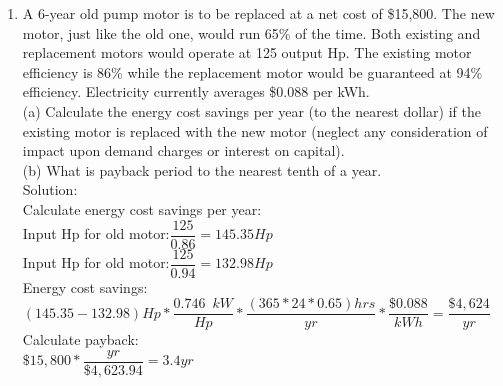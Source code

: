 \begin{enumerate}[1.]
\item A 6-year old pump motor is to be replaced at a net cost of \$15,800. The new motor, just like the old one, would run 65\% of the time. Both existing and replacement motors would operate at 125 output Hp. The existing motor efficiency is 86\% while the replacement motor would be guaranteed at 94\% efficiency. Electricity currently averages \$0.088 per kWh.\\
\vspace{0.4cm}
(a) Calculate the energy cost savings per year (to the nearest dollar) if the existing motor is replaced with the new motor (neglect any consideration of impact upon demand charges or interest on capital).\\
\vspace{0.4cm}
(b) What is payback period to the nearest tenth of a year.\\
\vspace{0.4cm}
Solution:\\
\vspace{0.4cm}
Calculate energy cost savings per year:\\
\vspace{0.4cm}
Input Hp for old motor:$\dfrac{125}{0.86}=145.35Hp$\\
\vspace{0.4cm}
Input Hp for old motor:$\dfrac{125}{0.94}=132.98Hp$\\
\vspace{0.4cm}
Energy cost savings:\\$(145.35-132.98)Hp*\dfrac{0.746 \enspace kW}{Hp}*\dfrac{(365*24*0.65)hrs}{yr}*\dfrac{\$0.088}{kWh}=\boxed{\dfrac{\$4,624}{yr}}$\\
\vspace{0.4cm}
Calculate payback:\\
\vspace{0.4cm}
$\$15,800*\dfrac{yr}{\$4,623.94}=\boxed{3.4yr}$

\end{enumerate}
